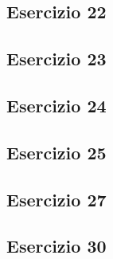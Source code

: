\subsection{Esercizio 22}


\subsection{Esercizio 23}


\subsection{Esercizio 24}


\subsection{Esercizio 25}


\subsection{Esercizio 27}


\subsection{Esercizio 30}

